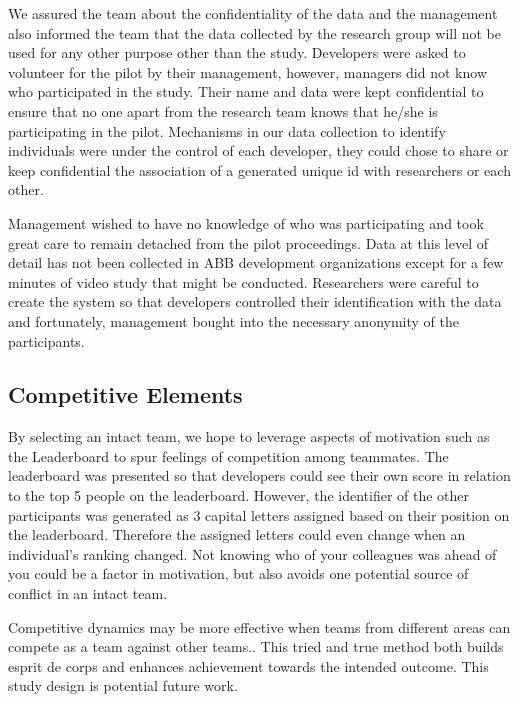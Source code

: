 \documentclass{sig-alternate}
\begin{document}
We  assured the team about the confidentiality of the data and the management also informed the team that the data collected by the research group will not be used for any other purpose other than the study.  Developers were asked to volunteer for the pilot by their management, however, managers did not know who participated in the study. Their name and data were kept confidential to ensure that no one apart from the research team knows that he/she is participating in the pilot. Mechanisms in our data collection to identify individuals were under the control of each developer, they could chose to share or keep confidential the association of a generated unique id with researchers or each other.   

Management wished to have no knowledge of who was participating and took great care to remain detached from the pilot proceedings.  Data at this level of detail has not been collected in ABB development organizations except for a few minutes of video study that might be conducted.  Researchers were careful to create the system so that developers controlled their identification with the data and fortunately, management bought into the necessary anonymity of the participants.

\subsection{Competitive Elements}
By selecting an intact team, we hope to leverage aspects of motivation such as the Leaderboard to spur feelings of competition among teammates.    The leaderboard was presented so that developers could see their own score in relation to the top 5 people on the leaderboard.  However, the identifier of the other participants was generated as 3 capital letters assigned based on their position on the leaderboard.  Therefore the assigned letters could even change when an individual's ranking changed.  Not knowing who of your colleagues was ahead of you could be a factor in motivation, but also avoids one potential source of conflict in an intact team.

Competitive dynamics may be more effective when teams from different areas can compete as a team against other teams..  This tried and true method both builds esprit de corps and enhances achievement towards the intended outcome.  This study design is potential future work. 
\end{document}
